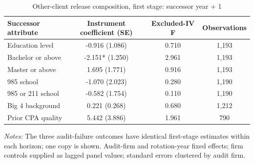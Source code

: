 \begin{table}[htbp]
\footnotesize
\centering
\caption{Other-client release composition, first stage: successor year + 1}
\begin{threeparttable}
\begin{tabular}{p{}ccc}
\toprule
Successor attribute & Instrument coefficient (SE) & Excluded-IV F & Observations \\
\midrule
Education level & -0.916 (1.086) & 0.710 & 1,193 \\
Bachelor or above & -2.151* (1.250) & 2.961 & 1,193 \\
Master or above & 1.695 (1.771) & 0.916 & 1,193 \\
985 school & -1.070 (2.023) & 0.280 & 1,190 \\
985 or 211 school & -0.582 (1.754) & 0.110 & 1,190 \\
Big 4 background & 0.221 (0.268) & 0.680 & 1,212 \\
Prior CPA quality & 5.442 (3.886) & 1.961 & 790 \\
\bottomrule
\end{tabular}
\begin{tablenotes}\footnotesize
\item \raggedright \textit{Notes:} The three audit-failure outcomes have identical first-stage estimates within each horizon; one copy is shown. Audit-firm and rotation-year fixed effects; firm controls supplied as lagged panel values; standard errors clustered by audit firm.
\end{tablenotes}
\end{threeparttable}
\end{table}
